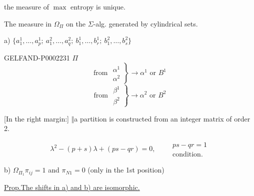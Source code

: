 the measure of $\max$ entropy is unique.



The measure in $\Omega_\Pi$ on the $\Sigma$-alg. generated by cylindrical sets.





a) $\{a_1^1,\ldots, a_p^1;\ a_1^2,\ldots, a_q^2;\ b_1^1,\ldots, b_r^1;\ b_1^2,\ldots, b_s^2\}$



\begin{GelfandAdjacentEvidence}{GELFAND-P000223}{1}
$\Pi$
\begin{equation*}
 \text{from }\left.\begin{gathered}\alpha^1\\\alpha^2\end{gathered}\right\}
 \longrightarrow\alpha^1\text{ or }B^1
\end{equation*}
\begin{equation*}
 \text{from }\left.\begin{gathered}\beta^1\\\beta^2\end{gathered}\right\}
 \longrightarrow\alpha^2\text{ or }B^2
\end{equation*}
\end{GelfandAdjacentEvidence}

[In the right margin:] $\Vert$\quad a partition is constructed from an integer matrix of order 2.



\begin{equation*}
\lambda^2-(p+s)\lambda+(ps-qr)=0,\qquad
\begin{gathered}\boxed{\boxed{ps-qr=1}}\\\text{condition.}\end{gathered}
\end{equation*}



b) $\Omega_{\Pi_1}$\qquad $\pi_{ij}=1$ and $\pi_{N1}=0$ (only in the 1st position)



\underline{\underline{Prop.}}\quad\underline{The shifts in a) and b) are isomorphic.}



